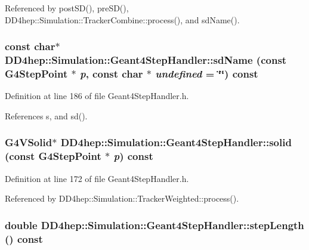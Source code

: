 Referenced by postSD(), preSD(), DD4hep::Simulation::TrackerCombine::process(), and sdName().\hypertarget{class_d_d4hep_1_1_simulation_1_1_geant4_step_handler_a0bf72f4bb74c03b2489ab9c9b79e7a30}{
\subsubsection[{sdName}]{\setlength{\rightskip}{0pt plus 5cm}const char$\ast$ DD4hep::Simulation::Geant4StepHandler::sdName (const G4StepPoint $\ast$ {\em p}, \/  const char $\ast$ {\em undefined} = {\ttfamily \char`\"{}\char`\"{}}) const}}
\label{class_d_d4hep_1_1_simulation_1_1_geant4_step_handler_a0bf72f4bb74c03b2489ab9c9b79e7a30}


Definition at line 186 of file Geant4StepHandler.h.

References s, and sd().\hypertarget{class_d_d4hep_1_1_simulation_1_1_geant4_step_handler_a8ce2c4056ad81f1d2500abfa819a2198}{
\subsubsection[{solid}]{\setlength{\rightskip}{0pt plus 5cm}G4VSolid$\ast$ DD4hep::Simulation::Geant4StepHandler::solid (const G4StepPoint $\ast$ {\em p}) const}}
\label{class_d_d4hep_1_1_simulation_1_1_geant4_step_handler_a8ce2c4056ad81f1d2500abfa819a2198}


Definition at line 172 of file Geant4StepHandler.h.

Referenced by DD4hep::Simulation::TrackerWeighted::process().\hypertarget{class_d_d4hep_1_1_simulation_1_1_geant4_step_handler_ab5ff5a25a2af70cd601dc9cf0d4c4447}{
\subsubsection[{stepLength}]{\setlength{\rightskip}{0pt plus 5cm}double DD4hep::Simulation::Geant4StepHandler::stepLength () const}}
\label{class_d_d4hep_1_1_simulation_1_1_geant4_step_handler_ab5ff5a25a2af70cd601dc9cf0d4c4447}


